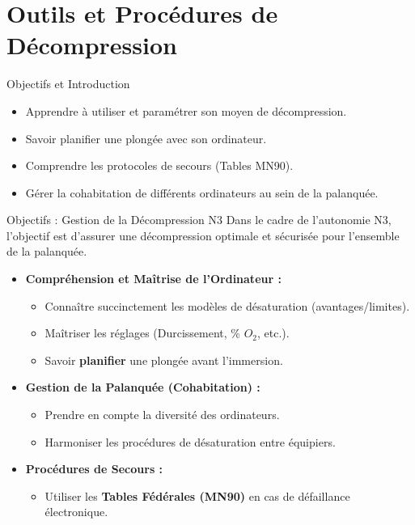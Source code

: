 \section{Outils et Procédures de Décompression}

\begin{frame}{Objectifs et Introduction}
    \begin{itemize}
        \item Apprendre à utiliser et paramétrer son moyen de décompression.
        \item Savoir planifier une plongée avec son ordinateur.
        \item Comprendre les protocoles de secours (Tables MN90).
        \item Gérer la cohabitation de différents ordinateurs au sein de la palanquée.
    \end{itemize}
\end{frame}

\begin{frame}{Objectifs : Gestion de la Décompression N3}
    \small
    Dans le cadre de l'autonomie N3, l'objectif est d'assurer une décompression optimale et sécurisée pour l'ensemble de la palanquée.

    \vspace{0.3cm}

    \begin{itemize}
        \item \textbf{Compréhension et Maîtrise de l'Ordinateur :}
        \begin{itemize}
            \item Connaître succinctement les modèles de désaturation (avantages/limites).
            \item Maîtriser les réglages (Durcissement, \% $O_2$, etc.).
            \item Savoir \textbf{planifier} une plongée avant l'immersion.
        \end{itemize}

        \vspace{0.2cm}

        \item \textbf{Gestion de la Palanquée (Cohabitation) :}
        \begin{itemize}
            \item Prendre en compte la diversité des ordinateurs.
            \item Harmoniser les procédures de désaturation entre équipiers.
        \end{itemize}

        \vspace{0.2cm}

        \item \textbf{Procédures de Secours :}
        \begin{itemize}
            \item Utiliser les \textbf{Tables Fédérales (MN90)} en cas de défaillance électronique.
        \end{itemize}
    \end{itemize}
\end{frame}

